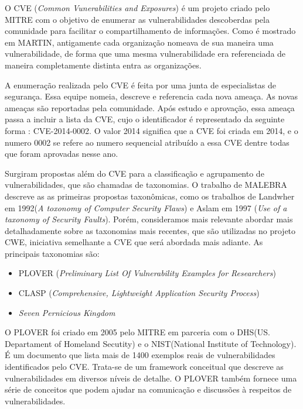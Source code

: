 %

O CVE (\emph{Common Vunerabilities and Exposures}) é um projeto criado pelo MITRE com o objetivo de enumerar as vulnerabilidades descoberdas pela comunidade para facilitar o compartilhamento de informações. Como é mostrado em MARTIN, antigamente cada organização nomeava de sua maneira uma vulnerabilidade, de forma que uma mesma vulnerabilidade era referenciada de maneira completamente distinta entra as organizações. 

%

A enumeração realizada pelo CVE é feita por uma junta de especialistas 	de segurança. Essa equipe nomeia, descreve e referencia cada nova ameaça. As novas ameaças são reportadas pela comunidade. Após estudo e aprovação, essa ameaça passa a incluir a lista da CVE, cujo o identificador é representado da seguinte forma : CVE-2014-0002. O valor 2014 significa que a CVE foi criada em 2014, e o numero 0002 se refere ao numero sequencial atribuído a essa CVE dentre todas que foram aprovadas nesse ano.

%

Surgiram propostas além do CVE para a classificação e agrupamento de vulnerabilidades, que são chamadas de taxonomias. O trabalho de MALEBRA descreve as as primeiras propostas taxonômicas, como os trabalhos de Landwher em 1992(\emph{A toxonomy of Computer Security Flaws}) e Aslam em 1997 (\emph{Use of  a taxonomy of Security Faults}). Porém, consideramos mais relevante abordar mais detalhadamente sobre as taxonomias mais recentes, que são utilizadas no projeto CWE, iniciativa semelhante a CVE que será abordada mais adiante. As principais taxonomias são:

%

\begin{itemize}
\item PLOVER (\emph{Preliminary List Of Vulnerability Examples for Researchers})
\item CLASP (\emph{Comprehensive, Lightweight Application Security Process})
\item \emph{Seven Pernicious Kingdom}
\end{itemize}

%

O PLOVER foi criado em 2005 pelo MITRE em parceria com o DHS(US. Departament of Homeland Secutity) e o NIST(National Institute of Technology). É um documento que lista mais de 1400 exemplos reais de vulnerabilidades identificados pelo CVE. Trata-se de um framework conceitual que descreve as vulnerabilidades em diversos níveis de detalhe. O PLOVER também fornece uma série de conceitos que podem ajudar na comunicação e discussões à respeitos de vulnerabilidades.


